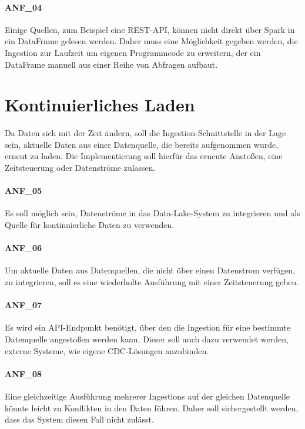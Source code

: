 \paragraph{ANF\_04}
\label{ANF_04}
Einige Quellen, zum Beispiel eine REST-API, können nicht direkt über Spark in ein DataFrame gelesen werden.
Daher muss eine Möglichkeit gegeben werden, die Ingestion zur Laufzeit um eigenen Programmcode zu erweitern, der ein DataFrame manuell aus einer Reihe von Abfragen aufbaut.

\section{Kontinuierliches Laden}
\label{sec:anf-ci}
Da Daten sich mit der Zeit ändern, soll die Ingestion-Schnittstelle in der Lage sein, aktuelle Daten aus einer Datenquelle, die bereits aufgenommen wurde, erneut zu laden.
Die Implementierung soll hierfür das erneute Anstoßen, eine Zeitsteuerung oder Datenströme zulassen.

\paragraph{ANF\_05}
\label{ANF_05}
Es soll möglich sein, Datenströme in das Data-Lake-System zu integrieren und als Quelle für kontinuierliche Daten zu verwenden.

\paragraph{ANF\_06}
\label{ANF_06}
Um aktuelle Daten aus Datenquellen, die nicht über einen Datenstrom verfügen, zu integrieren, soll es eine  wiederholte Ausführung mit einer Zeitsteuerung geben.

\paragraph{ANF\_07}
\label{ANF_07}
Es wird ein API-Endpunkt benötigt, über den die Ingestion für eine bestimmte Datenquelle angestoßen werden kann.
Dieser soll auch dazu verwendet werden, externe Systeme, wie eigene CDC-Lösungen anzubinden.

\paragraph{ANF\_08}
\label{ANF_08}
Eine gleichzeitige Ausführung mehrerer Ingestions auf der gleichen Datenquelle könnte leicht zu Konflikten in den Daten führen.
Daher soll sichergestellt werden, dass das System diesen Fall nicht zulässt.

